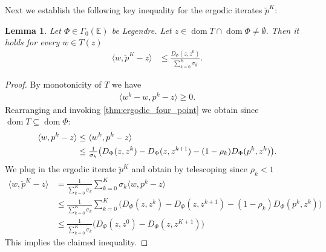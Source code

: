 \documentclass[11pt,onecolumn]{article}
\DeclareMathOperator{\dom}{dom}
\newtheorem{lemma}[lemma]{Lemma}
\theoremstyle{remark}
\begin{document}
Next we establish the following key inequality for the ergodic iterates $\breve p^K$:
\begin{lemma} \label{thm:ergodic_fixed}
Let $\Phi \in \Gamma_0(\mathbb{E})$ be Legendre. Let $z \in \dom T \cap \dom \Phi \neq \emptyset$. Then it holds for every $w \in T(z)$
\begin{align}
\langle w, \breve p^K - z\rangle &\leq \frac{D_\Phi(z,z^0)}{\sum_{k=0}^K \sigma_k}.
\end{align}
\end{lemma}
\begin{proof}
By monotonicity of $T$ we have
\begin{align}
    \langle w^k - w, p^k - z\rangle \geq 0.
\end{align}
Rearranging and invoking \cref{thm:ergodic_four_point} we obtain since $\dom T \subseteq \dom \Phi$:
\begin{align} \label{eq:gap_lemma_telescoping}
    \langle w,  p^k - z\rangle &\leq \langle w^k,  p^k - z\rangle \notag\\
   &\leq \tfrac{1}{\sigma_k}\big(D_\Phi(z,z^k) -  D_\Phi(z,z^{k+1}) - (1-\rho_k) D_\Phi(p^k,z^{k})\big).
\end{align}
We plug in the ergodic iterate $\breve p^K$ and obtain by telescoping since $\rho_k < 1$
\begin{align}
    \langle w, \breve p^K - z\rangle &= \frac{1}{\sum_{k=0}^K \sigma_k} \sum_{k=0}^K \sigma_k \langle w, p^k - z\rangle \\
    &\leq \frac{1}{\sum_{k=0}^K \sigma_k} \sum_{k=0}^K\big(D_\Phi(z,z^k) -  D_\Phi(z,z^{k+1}) - (1-\rho_k) D_\Phi(p^k,z^{k})\big) \\
    &\leq \frac{1}{\sum_{k=0}^K \sigma_k} \big(D_\Phi(z,z^0) -  D_\Phi(z,z^{K+1})\big)
\end{align}
This implies the claimed inequality.
\end{proof}
\end{document}
